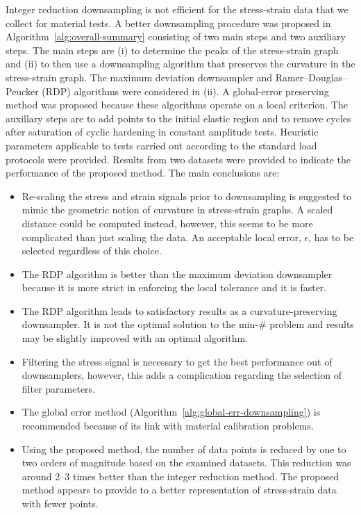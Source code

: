 \documentclass[a4paper,11pt]{article}
\begin{document}
Integer reduction downsampling is not efficient for the stress-strain data that we collect for material tests.
A better downsampling procedure was proposed in Algorithm~\ref{alg:overall-summary} consisting of two main steps and two auxiliary steps.
The main steps are (i) to determine the peaks of the stress-strain graph and (ii) to then use a downsampling algorithm that preserves the curvature in the stress-strain graph.
The maximum deviation downsampler and Ramer–Douglas–Peucker (RDP) algorithms were considered in (ii).
A global-error preserving method was proposed because these algorithms operate on a local criterion.
The auxillary steps are to add points to the initial elastic region and to remove cycles after saturation of cyclic hardening in constant amplitude tests.
Heuristic parameters applicable to tests carried out according to the standard load protocols were provided.
Results from two datasets were provided to indicate the performance of the proposed method.
The main conclusions are:
\begin{itemize}
    \item Re-scaling the stress and strain signals prior to downsampling is suggested to mimic the geometric notion of curvature in stress-strain graphs. A scaled distance could be computed instead, however, this seems to be more complicated than just scaling the data. An acceptable local error, $\epsilon$, has to be selected regardless of this choice.
    \item The RDP algorithm is better than the maximum deviation downsampler because it is more strict in enforcing the local tolerance and it is faster.
    \item The RDP algorithm leads to satisfactory results as a curvature-preserving downsampler. It is not the optimal solution to the min-\# problem and results may be slightly improved with an optimal algorithm.
    \item Filtering the stress signal is necessary to get the best performance out of downsamplers, however, this adds a complication regarding the selection of filter parameters.
    \item The global error method (Algorithm~\ref{alg:global-err-downsampling}) is recommended because of its link with material calibration problems.
    \item Using the proposed method, the number of data points is reduced by one to two orders of magnitude based on the examined datasets. This reduction was around 2--3 times better than the integer reduction method. The proposed method appears to provide to a better representation of stress-strain data with fewer points.
\end{itemize}
\end{document}
